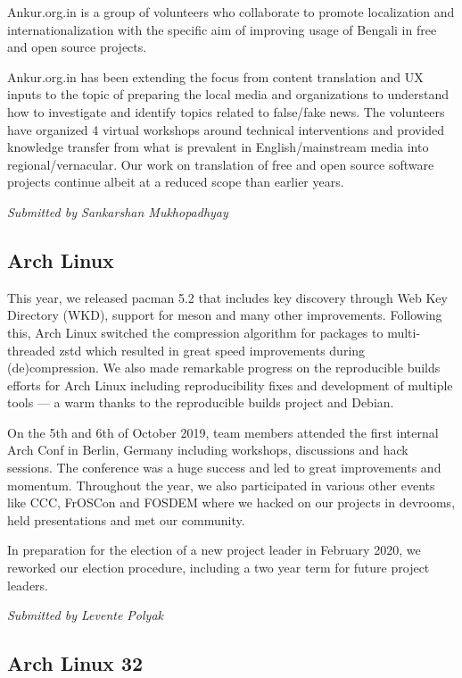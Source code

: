 \documentclass[a4paper]{report}
\begin{document}
Ankur.org.in is a group of volunteers who collaborate to promote
localization and internationalization with the specific aim of improving
usage of Bengali in free and open source projects.

Ankur.org.in has been extending the focus from content translation and
UX inputs to the topic of preparing the local media and organizations to
understand how to investigate and identify topics related to false/fake
news. The volunteers have organized 4 virtual workshops around technical
interventions and provided knowledge transfer from what is prevalent in
English/mainstream media into regional/vernacular. Our work on
translation of free and open source software projects continue albeit at
a reduced scope than earlier years.

{\em Submitted by Sankarshan Mukhopadhyay}

\subsection{Arch Linux}

This year, we released pacman 5.2 that includes key discovery through
Web Key Directory (WKD), support for meson and many other improvements.
Following this, Arch Linux switched the compression algorithm for
packages to multi-threaded zstd which resulted in great speed
improvements during (de)compression.  We also made remarkable progress
on the reproducible builds efforts for Arch Linux including
reproducibility fixes and development of multiple tools --- a warm
thanks to the reproducible builds project and Debian.

On the 5th and 6th of October 2019, team members attended the first
internal Arch Conf in Berlin, Germany including workshops, discussions
and hack sessions. The conference was a huge success and led to great
improvements and momentum. Throughout the year, we also participated in
various other events like CCC, FrOSCon and FOSDEM where we hacked on our
projects in devrooms, held presentations and met our community.

In preparation for the election of a new project leader in February
2020, we reworked our election procedure, including a two year term for
future project leaders.

{\em Submitted by Levente Polyak}

\subsection{Arch Linux 32}
\end{document}
